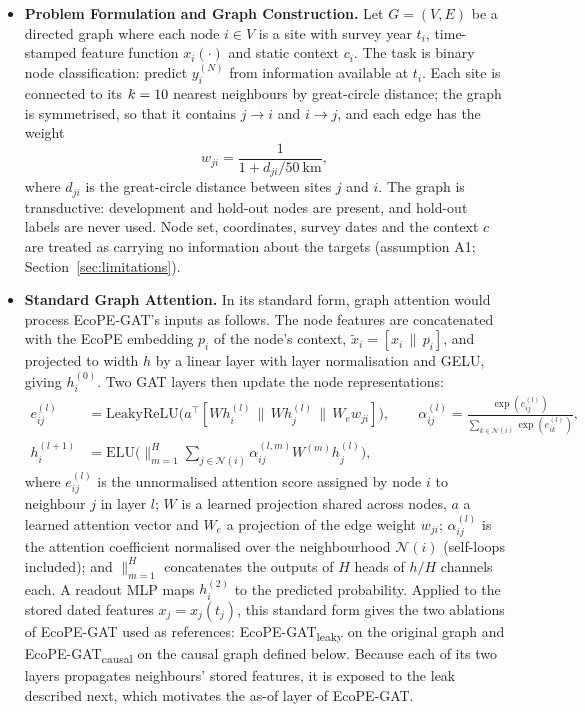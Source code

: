 \documentclass[a4paper,fleqn]{cas-sc}
\newcommand{\Mcausal}{\mbox{EcoPE-GAT\textsubscript{causal}}}
\newcommand{\Mleaky}{\mbox{EcoPE-GAT\textsubscript{leaky}}}
\begin{document}
\begin{itemize}[leftmargin=1.4em]

\item \textbf{Problem Formulation and Graph Construction.} Let $G=(V,E)$ be a directed graph where each node $i \in V$ is a site with survey year $t_i$, time-stamped feature function $x_i(\cdot)$ and static context $c_i$. The task is binary node classification: predict $y_i^{(N)}$ from information available at $t_i$. Each site is connected to its $k = 10$ nearest neighbours by great-circle distance; the graph is symmetrised, so that it contains $j \to i$ and $i \to j$, and each edge has the weight
\begin{equation}
w_{ji} = \frac{1}{1 + d_{ji}/50\ \text{km}},
\end{equation}
where $d_{ji}$ is the great-circle distance between sites $j$ and $i$. The graph is transductive: development and hold-out nodes are present, and hold-out labels are never used. Node set, coordinates, survey dates and the context $c$ are treated as carrying no information about the targets (assumption A1; Section~\ref{sec:limitations}).

\item \textbf{Standard Graph Attention.} In its standard form, graph attention would process EcoPE-GAT's inputs as follows. The node features are concatenated with the EcoPE embedding $p_i$ of the node's context, $\tilde{x}_i = [x_i \,\|\, p_i]$, and projected to width $h$ by a linear layer with layer normalisation and GELU, giving $h_i^{(0)}$. Two GAT layers then update the node representations:
\begin{align}
e_{ij}^{(l)} &= \mathrm{LeakyReLU}\big(a^\top [W h_i^{(l)} \,\|\, W h_j^{(l)} \,\|\, W_e w_{ji}]\big), \qquad
\alpha_{ij}^{(l)} = \frac{\exp(e_{ij}^{(l)})}{\sum_{k \in \mathcal{N}(i)} \exp(e_{ik}^{(l)})}, \\
h_i^{(l+1)} &= \mathrm{ELU}\Big(\big\|_{m=1}^{H} \sum_{j \in \mathcal{N}(i)} \alpha_{ij}^{(l,m)} W^{(m)} h_j^{(l)}\Big),
\end{align}
where $e_{ij}^{(l)}$ is the unnormalised attention score assigned by node $i$ to neighbour $j$ in layer $l$; $W$ is a learned projection shared across nodes, $a$ a learned attention vector and $W_e$ a projection of the edge weight $w_{ji}$; $\alpha_{ij}^{(l)}$ is the attention coefficient normalised over the neighbourhood $\mathcal{N}(i)$ (self-loops included); and $\|_{m=1}^{H}$ concatenates the outputs of $H$ heads of $h/H$ channels each. A readout MLP maps $h_i^{(2)}$ to the predicted probability. Applied to the stored dated features $x_j = x_j(t_j)$, this standard form gives the two ablations of EcoPE-GAT used as references: \Mleaky{} on the original graph and \Mcausal{} on the causal graph defined below. Because each of its two layers propagates neighbours' stored features, it is exposed to the leak described next, which motivates the as-of layer of EcoPE-GAT.


\end{itemize}
\end{document}
